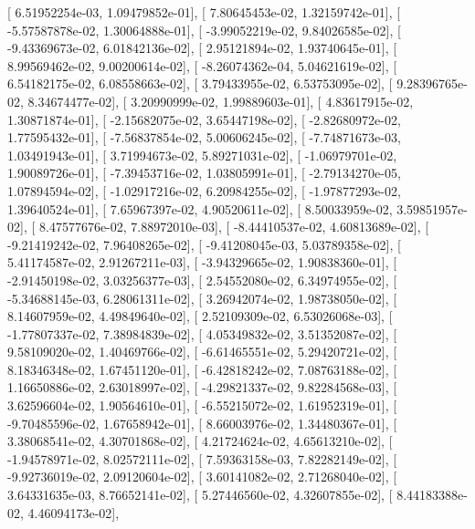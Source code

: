 \documentclass{article}
\begin{document}
       [  6.51952254e-03,   1.09479852e-01],
       [  7.80645453e-02,   1.32159742e-01],
       [ -5.57587878e-02,   1.30064888e-01],
       [ -3.99052219e-02,   9.84026585e-02],
       [ -9.43369673e-02,   6.01842136e-02],
       [  2.95121894e-02,   1.93740645e-01],
       [  8.99569462e-02,   9.00200614e-02],
       [ -8.26074362e-04,   5.04621619e-02],
       [  6.54182175e-02,   6.08558663e-02],
       [  3.79433955e-02,   6.53753095e-02],
       [  9.28396765e-02,   8.34674477e-02],
       [  3.20990999e-02,   1.99889603e-01],
       [  4.83617915e-02,   1.30871874e-01],
       [ -2.15682075e-02,   3.65447198e-02],
       [ -2.82680972e-02,   1.77595432e-01],
       [ -7.56837854e-02,   5.00606245e-02],
       [ -7.74871673e-03,   1.03491943e-01],
       [  3.71994673e-02,   5.89271031e-02],
       [ -1.06979701e-02,   1.90089726e-01],
       [ -7.39453716e-02,   1.03805991e-01],
       [ -2.79134270e-05,   1.07894594e-02],
       [ -1.02917216e-02,   6.20984255e-02],
       [ -1.97877293e-02,   1.39640524e-01],
       [  7.65967397e-02,   4.90520611e-02],
       [  8.50033959e-02,   3.59851957e-02],
       [  8.47577676e-02,   7.88972010e-03],
       [ -8.44410537e-02,   4.60813689e-02],
       [ -9.21419242e-02,   7.96408265e-02],
       [ -9.41208045e-03,   5.03789358e-02],
       [  5.41174587e-02,   2.91267211e-03],
       [ -3.94329665e-02,   1.90838360e-01],
       [ -2.91450198e-02,   3.03256377e-03],
       [  2.54552080e-02,   6.34974955e-02],
       [ -5.34688145e-03,   6.28061311e-02],
       [  3.26942074e-02,   1.98738050e-02],
       [  8.14607959e-02,   4.49849640e-02],
       [  2.52109309e-02,   6.53026068e-03],
       [ -1.77807337e-02,   7.38984839e-02],
       [  4.05349832e-02,   3.51352087e-02],
       [  9.58109020e-02,   1.40469766e-02],
       [ -6.61465551e-02,   5.29420721e-02],
       [  8.18346348e-02,   1.67451120e-01],
       [ -6.42818242e-02,   7.08763188e-02],
       [  1.16650886e-02,   2.63018997e-02],
       [ -4.29821337e-02,   9.82284568e-03],
       [  3.62596604e-02,   1.90564610e-01],
       [ -6.55215072e-02,   1.61952319e-01],
       [ -9.70485596e-02,   1.67658942e-01],
       [  8.66003976e-02,   1.34480367e-01],
       [  3.38068541e-02,   4.30701868e-02],
       [  4.21724624e-02,   4.65613210e-02],
       [ -1.94578971e-02,   8.02572111e-02],
       [  7.59363158e-03,   7.82282149e-02],
       [ -9.92736019e-02,   2.09120604e-02],
       [  3.60141082e-02,   2.71268040e-02],
       [  3.64331635e-03,   8.76652141e-02],
       [  5.27446560e-02,   4.32607855e-02],
       [  8.44183388e-02,   4.46094173e-02],
\end{document}
